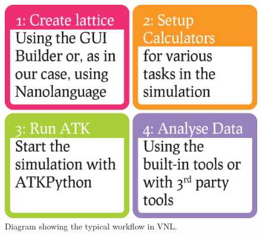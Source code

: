 \begin{figure}
  \centering
  \includegraphics[width=\columnwidth]{Figures/Workflow.eps}
  \caption{Diagram showing the typical workflow in VNL.}
  \label{workflow}
\end{figure}
